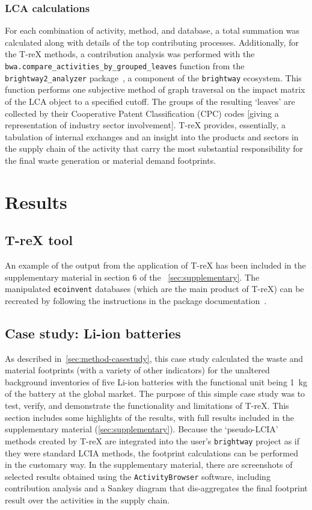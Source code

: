 \documentclass[a4paper,fleqn]{cas-dc}
\begin{document}
\subsubsection{LCA calculations}
For each combination of activity, method, and database, a total summation was
calculated along with details of the top contributing processes. Additionally,
for the T-reX methods, a contribution analysis was performed with the
\texttt{bwa.compare\_activities\_by\_grouped\_leaves} function from the
\texttt{brightway2\_analyzer} package~\citep{mutel2016brightway2analyzer}, a
component of the \texttt{brightway} ecosystem. This function performs one
subjective method of graph traversal on the impact matrix of the LCA object to
a specified cutoff. The groups of the resulting `leaves' are collected by their
Cooperative Patent Classification (CPC) codes [giving a representation of
industry sector involvement]. T-reX provides, essentially, a tabulation of
internal exchanges and an insight into the products and sectors in the supply
chain of the activity that carry the most substantial responsibility for the
final waste generation or material demand footprints.

\section{Results}\label{sec:results}
\subsection{T-reX tool}\label{sec:results-T-reX}

An example of the output from the application of T-reX has been included in the
supplementary material in section 6 of the ~\autoref{sec:supplementary}. The
manipulated \texttt{ecoinvent} databases (which are the main product of T-reX)
can be recreated by following the instructions in the package
documentation~\citep{mcdowall2023T-reXdocs}.

\subsection{Case study: Li-ion batteries}\label{sec:results-casestudy}

As described in~\autoref{sec:method-casestudy}, this case study calculated the
waste and material footprints (with a variety of other indicators) for the
unaltered background inventories of five Li-ion batteries with the functional
unit being 1~kg of the battery at the global market. The purpose of this simple
case study was to test, verify, and demonstrate the functionality and
limitations of T-reX. This section includes some highlights of the results,
with full results included in the supplementary material
(\autoref{sec:supplementary}). Because the `pseudo-LCIA' methods created by
T-reX are integrated into the user's \texttt{brightway} project as if they were
standard LCIA methods, the footprint calculations can be performed in the
customary way. In the supplementary material, there are screenshots of selected
results obtained using the \texttt{ActivityBrowser} software, including
contribution analysis and a Sankey diagram that dis-aggregates the final
footprint result over the activities in the supply chain.
\end{document}
